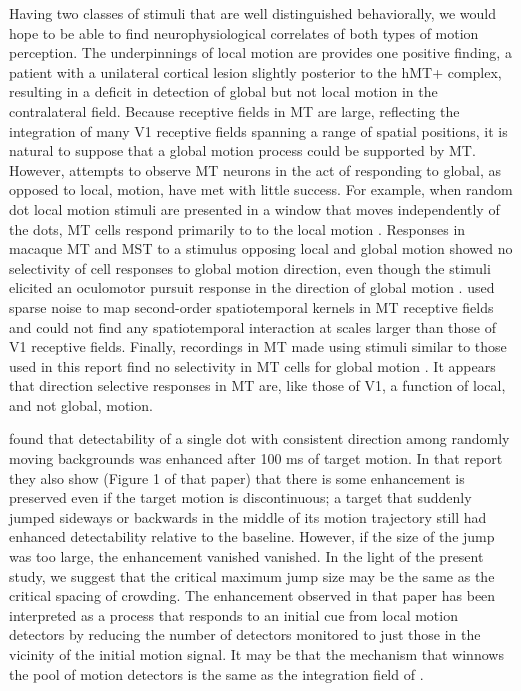 \documentclass[manuscript]{subfiles}
\begin{document}
Having two classes of stimuli that are well distinguished
behaviorally, we would hope to be able to find neurophysiological
correlates of both types of motion perception. The underpinnings of
local motion are \cite{Vaina:1996pi} provides one positive
finding, a patient with a unilateral cortical lesion slightly
posterior to the hMT+ complex, resulting in a deficit in detection of
global but not local motion in the contralateral field. Because
receptive fields in MT are large, reflecting the integration of many
V1 receptive fields spanning a range of spatial positions, it is
natural to suppose that a global motion process could be supported by
MT. However, attempts to observe MT neurons in the act of responding
to global, as opposed to local, motion, have met with little
success. For example, when random dot local motion stimuli are
presented in a window that moves independently of the dots, MT cells
respond primarily to to the local
motion \citep{Priebe:2001hl}. Responses in macaque MT and MST to a
stimulus opposing local and global motion showed no selectivity of
cell responses to global motion direction, even though the stimuli
elicited an oculomotor pursuit response in the direction of global
motion \citep{Ilg:2004qc}. \cite{Livingstone:2001ao} used sparse
noise to map second-order spatiotemporal kernels in MT receptive
fields and could not find any spatiotemporal interaction at scales
larger than those of V1 receptive fields. Finally, recordings in MT
made using stimuli similar to those used in this report find no
selectivity in MT cells for global
motion \citep{Shadlen:1993ne,Hedges:2004pr}. It appears that direction
selective responses in MT are, like those of V1, a function of local,
and not global, motion.

\cite{VerghesePreeti2002} found
that detectability of a single dot with consistent direction among
randomly moving backgrounds was enhanced after 100 ms of target
motion. In that report they also show (Figure 1 of that paper) that
there is some enhancement is preserved even if the target motion is
discontinuous; a target that suddenly jumped sideways or backwards in
the middle of its motion trajectory still had enhanced detectability
relative to the baseline. However, if the size of the jump was too
large, the enhancement vanished vanished. In the light of the present
study, we suggest that the critical maximum jump size may be the same
as the critical spacing of crowding. The enhancement observed in that
paper has been interpreted as a process that responds to an initial
cue from local motion detectors by reducing the number of detectors
monitored to just those in the vicinity of the initial motion
signal. It may be that the mechanism that winnows the pool of motion
detectors is the same as the integration field of \cite{Pelli:2004km}.

\biblio
\end{document}
